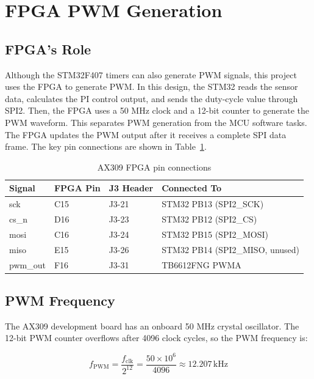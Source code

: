 \documentclass[12pt, a4paper]{report}
\begin{document}
\section{FPGA PWM Generation}


\subsection{FPGA's Role}
Although the STM32F407 timers can also generate PWM signals, this project uses the FPGA to generate PWM. In this design, the STM32 reads the sensor data, calculates the PI control output, and sends the duty-cycle value through SPI2. Then, the FPGA uses a 50 MHz clock and a 12-bit counter to generate the PWM waveform. This separates PWM generation from the MCU software tasks. The FPGA updates the PWM output after it receives a complete SPI data frame. The key pin connections are shown in Table~\ref{tab:fpga_pins}.

\begin{table}[H]
\centering
\caption{AX309 FPGA pin connections}
\label{tab:fpga_pins}
\small
\begin{tabular}{@{}p{}p{}p{}p{}@{}}
\toprule
Signal & FPGA Pin & J3 Header & Connected To \\
\midrule
sck & C15 & J3-21 & STM32 PB13 (SPI2\_SCK) \\
cs\_n & D16 & J3-23 & STM32 PB12 (SPI2\_CS) \\
mosi & C16 & J3-24 & STM32 PB15 (SPI2\_MOSI) \\
miso & E15 & J3-26 & STM32 PB14 (SPI2\_MISO, unused) \\
pwm\_out & F16 & J3-31 & TB6612FNG PWMA \\
\bottomrule
\end{tabular}
\end{table}

\subsection{PWM Frequency}
The AX309 development board has an onboard 50 MHz crystal oscillator. The 12-bit PWM counter overflows after 4096 clock cycles, so the PWM frequency is:

\begin{equation}
f_{\text{PWM}} = \frac{f_{\text{clk}}}{2^{12}} = \frac{50 \times 10^6}{4096}
\approx 12.207\,\text{kHz}
\label{eq:pwm_freq}
\end{equation}
\end{document}
